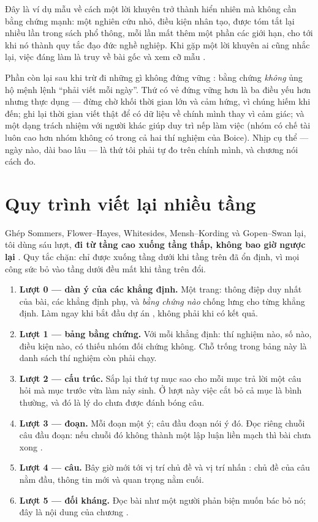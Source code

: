 \documentclass[../hieu-suat.tex]{subfiles}
\begin{document}
\begin{cambay}
Đây là ví dụ mẫu về cách một lời khuyên trở thành hiển nhiên mà không cần bằng chứng mạnh: một nghiên cứu nhỏ, điều kiện nhân tạo, được tóm tắt lại nhiều lần trong sách phổ thông, mỗi lần mất thêm một phần các giới hạn, cho tới khi nó thành quy tắc đạo đức nghề nghiệp. Khi gặp một lời khuyên ai cũng nhắc lại, việc đáng làm là truy về bài gốc và xem cỡ mẫu \nM{}.
\end{cambay}

Phần còn lại sau khi trừ đi những gì không đứng vững \nM{}: bằng chứng \emph{không} ủng hộ mệnh lệnh ``phải viết mỗi ngày''. Thứ có vẻ đứng vững hơn là ba điều yếu hơn nhưng thực dụng --- đừng chờ khối thời gian lớn và cảm hứng, vì chúng hiếm khi đến; ghi lại thời gian viết thật để có dữ liệu về chính mình thay vì cảm giác; và một dạng trách nhiệm với người khác giúp duy trì nếp làm việc (nhóm có chế tài luôn cao hơn nhóm không có trong cả hai thí nghiệm của Boice). Nhịp cụ thể --- ngày nào, dài bao lâu --- là thứ tôi phải tự đo trên chính mình, và chương  nói cách đo.

\section{Quy trình viết lại nhiều tầng}

Ghép Sommers, Flower--Hayes, Whitesides, Mensh--Kording và Gopen--Swan lại, tôi dùng sáu lượt, \textbf{đi từ tầng cao xuống tầng thấp, không bao giờ ngược lại} \nM{}. Quy tắc chặn: chỉ được xuống tầng dưới khi tầng trên đã ổn định, vì mọi công sức bỏ vào tầng dưới đều mất khi tầng trên đổi.

\begin{enumerate}
\item \textbf{Lượt 0 --- dàn ý của các khẳng định.} Một trang: thông điệp duy nhất của bài, các khẳng định phụ, và \emph{bằng chứng nào} chống lưng cho từng khẳng định. Làm ngay khi bắt đầu dự án \cite{whitesides2004}, không phải khi có kết quả.
\item \textbf{Lượt 1 --- bảng bằng chứng.} Với mỗi khẳng định: thí nghiệm nào, số nào, điều kiện nào, có thiếu nhóm đối chứng không. Chỗ trống trong bảng này là danh sách thí nghiệm còn phải chạy.
\item \textbf{Lượt 2 --- cấu trúc.} Sắp lại thứ tự mục sao cho mỗi mục trả lời một câu hỏi mà mục trước vừa làm nảy sinh. Ở lượt này việc cắt bỏ cả mục là bình thường, và đó là lý do chưa được đánh bóng câu.
\item \textbf{Lượt 3 --- đoạn.} Mỗi đoạn một ý; câu đầu đoạn nói ý đó. Đọc riêng chuỗi câu đầu đoạn: nếu chuỗi đó không thành một lập luận liền mạch thì bài chưa xong \nM{}.
\item \textbf{Lượt 4 --- câu.} Bây giờ mới tới vị trí chủ đề và vị trí nhấn \cite{gopen1990}: chủ đề của câu nằm đầu, thông tin mới và quan trọng nằm cuối.
\item \textbf{Lượt 5 --- đối kháng.} Đọc bài như một người phản biện muốn bác bỏ nó; đây là nội dung của chương .
\end{enumerate}
\end{document}
